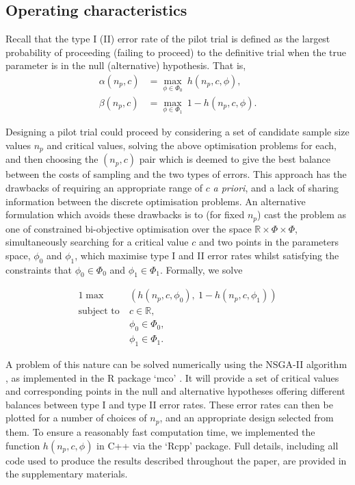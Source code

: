 \documentclass[AMA,STIX1COL]{WileyNJD-v2}
\begin{document}

\subsection{Operating characteristics}\label{sec:ocs}

Recall that the type I (II) error rate of the pilot trial is defined as the largest probability of proceeding (failing to proceed) to the definitive trial when the true parameter is in the null (alternative) hypothesis. That is, 
\begin{align*}
\alpha(n_p, c) &= \max_{\phi \in \Phi_0} ~ h(n_p, c, \phi) , \\
\beta(n_p, c) &= \max_{\phi \in \Phi_1}  ~ 1 - h(n_p, c, \phi).
\end{align*}

Designing a pilot trial could proceed by considering a set of candidate sample size values $n_p$ and critical values, solving the above optimisation problems for each, and then choosing the $(n_p, c)$ pair which is deemed to give the best balance between the costs of sampling and the two types of errors. This approach has the drawbacks of requiring an appropriate range of $c$ \emph{a priori}, and a lack of sharing information between the discrete optimisation problems. An alternative formulation which avoids these drawbacks is to (for fixed $n_p$) cast the problem as one of constrained bi-objective optimisation over the space $\mathbb{R} \times \Phi \times \Phi$, simultaneously searching for a critical value $c$ and two points in the parameters space, $\phi_0$ and $\phi_1$, which maximise type I and II error rates whilst satisfying the constraints that $\phi_0 \in \Phi_0$ and $\phi_1 \in \Phi_1$. Formally, we solve

\begin{alignat}{1}\label{eqn:MO_opt}
\max ~ & \left( h(n_p, c, \phi_0) , ~ 1 - h(n_p, c, \phi_1)  \right) \\
\text{subject to} ~ & c \in \mathbb{R}, \nonumber \\ 
& \phi_0 \in \Phi_0, \nonumber  \\
& \phi_1 \in \Phi_1. \nonumber 
\end{alignat}

A problem of this nature can be solved numerically using the NSGA-II algorithm \cite{Deb2002}, as implemented in the R package `mco' \cite{Mersmann2014}. It will provide a set of critical values and corresponding points in the null and alternative hypotheses offering different balances between type I and type II error rates. These error rates can then be plotted for a number of choices of $n_p$, and an appropriate design selected from them. To ensure a reasonably fast computation time, we implemented the function $h(n_p, c, \phi)$ in C++ via the `Rcpp' package\cite{Eddelbuettel2011}. Full details, including all code used to produce the results described throughout the paper, are provided in the supplementary materials.
\end{document}
